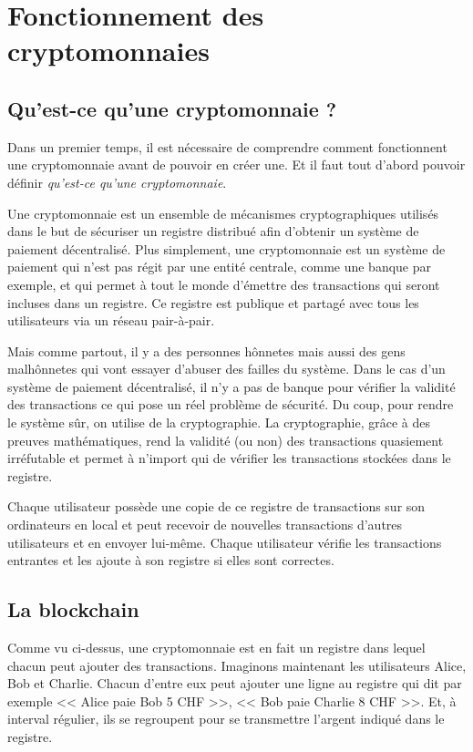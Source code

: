 \chapter{Fonctionnement des cryptomonnaies}
\label{ch:presentation}

\section{Qu'est-ce qu'une cryptomonnaie ?}

Dans un premier temps, il est nécessaire de comprendre comment fonctionnent une cryptomonnaie avant de pouvoir en créer une. Et il faut tout d'abord pouvoir définir \emph{qu'est-ce qu'une cryptomonnaie}.

Une cryptomonnaie est un ensemble de mécanismes cryptographiques utilisés dans le but de sécuriser un registre distribué afin d'obtenir un système de paiement décentralisé. Plus simplement, une cryptomonnaie est un système de paiement qui n'est pas régit par une entité centrale, comme une banque par exemple, et qui permet à tout le monde d'émettre des transactions qui seront incluses dans un registre. Ce registre est publique et partagé avec tous les utilisateurs via un réseau pair-à-pair.

Mais comme partout, il y a des personnes hônnetes mais aussi des gens malhônnetes qui vont essayer d'abuser des failles du système. Dans le cas d'un système de paiement décentralisé, il n'y a pas de banque pour vérifier la validité des transactions ce qui pose un réel problème de sécurité. Du coup, pour rendre le système sûr, on utilise de la cryptographie. La cryptographie, grâce à des preuves mathématiques, rend la validité (ou non) des transactions quasiement irréfutable et permet à n'import qui de vérifier les transactions stockées dans le registre.

Chaque utilisateur possède une copie de ce registre de transactions sur son ordinateurs en local et peut recevoir de nouvelles transactions d'autres utilisateurs et en envoyer lui-même. Chaque utilisateur vérifie les transactions entrantes et les ajoute à son registre si elles sont correctes.

\section{La blockchain}

Comme vu ci-dessus, une cryptomonnaie est en fait un registre dans lequel chacun peut ajouter des transactions. Imaginons maintenant les utilisateurs Alice, Bob et Charlie. Chacun d'entre eux peut ajouter une ligne au registre qui dit par exemple << Alice paie Bob 5 CHF >>, << Bob paie Charlie 8 CHF >>. Et, à interval régulier, ils se regroupent pour se transmettre l'argent indiqué dans le registre.

